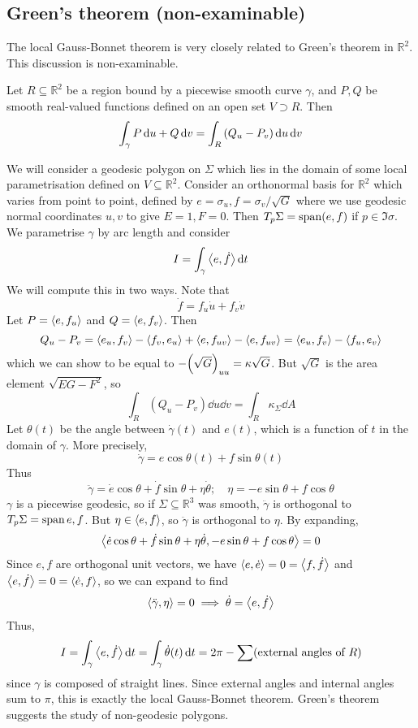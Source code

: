 \subsection{Green's theorem (non-examinable)}
The local Gauss-Bonnet theorem is very closely related to Green's theorem in \( \mathbb R^2 \).
This discussion is non-examinable.
\begin{theorem}
	Let \( R \subseteq \mathbb R^2 \) be a region bound by a piecewise smooth curve \( \gamma \), and \( P, Q \) be smooth real-valued functions defined on an open set \( V \supset R \).
	Then
	\[
		\int_\gamma P \dd{u}+ Q \dd{v} = \int_R \qty(Q_u - P_v) \dd{u} \dd{v}
	\]
\end{theorem}
We will consider a geodesic polygon on \( \Sigma \) which lies in the domain of some local parametrisation defined on \( V \subseteq \mathbb R^2 \).
Consider an orthonormal basis for \( \mathbb R^2 \) which varies from point to point, defined by \( e = \sigma_u, f = \sigma_v/\sqrt{G} \) where we use geodesic normal coordinates \( u,v \) to give \( E = 1, F = 0 \).
Then \( T_p \Sigma = \operatorname{span}(e,f) \) if \( p \in \Im \sigma \).
We parametrise \( \gamma \) by arc length and consider
\[
	I = \int_\gamma \left\langle{e,\dot f}\right\rangle \dd{t}
\]
We will compute this in two ways.
Note that
\[
	\dot f = f_u \dot u + f_v \dot v
\]
Let \( P = \left\langle{e,f_u}\right\rangle \) and \( Q = \left\langle{e,f_v}\right\rangle \).
Then
\[
	Q_u - P_v = \left\langle{e_u, f_v}\right\rangle - \left\langle{f_v, e_u}\right\rangle + \left\langle{e, f_{uv}}\right\rangle - \left\langle{e, f_{uv}}\right\rangle = \left\langle{e_u, f_v}\right\rangle - \left\langle{f_u, e_v}\right\rangle
\]
which we can show to be equal to \( -\qty(\sqrt{G})_{uu} = \kappa \sqrt{G} \).
But \( \sqrt{G} \) is the area element \( \sqrt{EG-F^2} \), so
\[
	\int_R (Q_u - P_v) \dd{u} \dd{v} = \int_R \kappa_\Sigma \dd{A}
\]
Let \( \theta(t) \) be the angle between \( \dot\gamma(t) \) and \( e(t) \), which is a function of \( t \) in the domain of \( \gamma \).
More precisely,
\[
	\dot \gamma = e \cos \theta(t) + f \sin \theta(t)
\]
Thus
\[
	\ddot \gamma = \dot e \cos \theta + \dot f \sin \theta + \eta \dot \theta;\quad \eta = -e\sin \theta + f \cos \theta
\]
\( \gamma \) is a piecewise geodesic, so if \( \Sigma \subseteq \mathbb R^3 \) was smooth, \( \ddot \gamma \) is orthogonal to \( T_p \Sigma = \operatorname{span}{e,f} \).
But \( \eta \in \langle{} e,f \rangle \), so \( \ddot \gamma \) is orthogonal to \( \eta \).
By expanding,
\[
	\left\langle{\dot e \cos \theta + \dot f \sin \theta + \eta \dot \theta, -e\sin\theta + f\cos \theta}\right\rangle = 0
\]
Since \( e, f \) are orthogonal unit vectors, we have \( \left\langle{e,\dot e}\right\rangle = 0 = \left\langle{f,\dot f}\right\rangle \) and \( \left\langle{e,\dot f}\right\rangle = 0 = \left\langle{\dot e, f}\right\rangle \), so we can expand to find
\[
	\left\langle{\ddot \gamma,\eta}\right\rangle = 0 \implies \dot \theta = \left\langle{e,\dot f}\right\rangle
\]
Thus,
\[
	I = \int_\gamma \left\langle{e,\dot f}\right\rangle \dd{t} = \int_\gamma \dot \theta(t) \dd{t} = 2\pi - \sum(\text{external angles of } R)
\]
since \( \gamma \) is composed of straight lines.
Since external angles and internal angles sum to \( \pi \), this is exactly the local Gauss-Bonnet theorem.
Green's theorem suggests the study of non-geodesic polygons.


